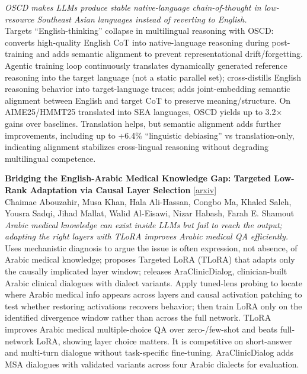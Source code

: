 \documentclass[12pt,letterpaper]{article}
\begin{document}
{\small\textit{OSCD makes LLMs produce stable native-language chain-of-thought in low-resource Southeast Asian languages instead of reverting to English.}}\\[1pt]
{\footnotesize Targets ``English-thinking'' collapse in multilingual reasoning with OSCD: converts high-quality English CoT into native-language reasoning during post-training and adds semantic alignment to prevent representational drift/forgetting. Agentic training loop continuously translates dynamically generated reference reasoning into the target language (not a static parallel set); cross-distills English reasoning behavior into target-language traces; adds joint-embedding semantic alignment between English and target CoT to preserve meaning/structure. On AIME25/HMMT25 translated into SEA languages, OSCD yields up to 3.2× gains over baselines. Translation helps, but semantic alignment adds further improvements, including up to +6.4\% ``linguistic debiasing'' vs translation-only, indicating alignment stabilizes cross-lingual reasoning without degrading multilingual competence.}

\medskip

{\small\textbf{Bridging the English-Arabic Medical Knowledge Gap: Targeted Low-Rank Adaptation via Causal Layer Selection}} {\scriptsize[\href{https://arxiv.org/abs/2608.00207}{arxiv}]}\\
{\scriptsize Chaimae Abouzahir, Musa Khan, Hala Ali-Hassan, Congbo Ma, Khaled Saleh, Yousra Sadqi, Jihad Mallat, Walid Al-Eisawi, Nizar Habash, Farah E. Shamout}\\

{\small\textit{Arabic medical knowledge can exist inside LLMs but fail to reach the output; adapting the right layers with TLoRA improves Arabic medical QA efficiently.}}\\[1pt]
{\footnotesize Uses mechanistic diagnosis to argue the issue is often expression, not absence, of Arabic medical knowledge; proposes Targeted LoRA (TLoRA) that adapts only the causally implicated layer window; releases AraClinicDialog, clinician-built Arabic clinical dialogues with dialect variants. Apply tuned-lens probing to locate where Arabic medical info appears across layers and causal activation patching to test whether restoring activations recovers behavior; then train LoRA only on the identified divergence window rather than across the full network. TLoRA improves Arabic medical multiple-choice QA over zero-/few-shot and beats full-network LoRA, showing layer choice matters. It is competitive on short-answer and multi-turn dialogue without task-specific fine-tuning. AraClinicDialog adds MSA dialogues with validated variants across four Arabic dialects for evaluation.}
\end{document}
